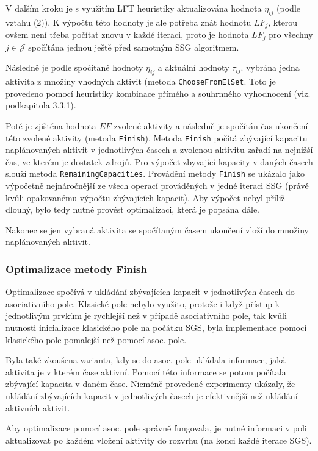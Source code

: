 \documentclass[a4paper,12pt]{article}
\begin{document}
V dalším kroku je s využitím LFT heuristiky aktualizována hodnota 
$\eta_{ij}$ (podle vztahu (2)). K výpočtu této hodnoty je ale potřeba znát hodnotu $LF_j$, kterou
ovšem není třeba počítat znovu v každé iteraci, proto je hodnota $LF_j$ pro všechny $j\in\mathcal{J}$
spočítána jednou ještě před samotným SSG algoritmem.

Následně je podle spočítané hodnoty $\eta_{ij}$ a aktuální hodnoty $\tau_{ij}$. vybrána jedna aktivita
z množiny vhodných aktivit (metoda \texttt{ChooseFromElSet}. Toto je provedeno pomocí heuristiky kombinace 
přímého a souhrnného vyhodnocení (viz. podkapitola 3.3.1).

Poté je zjištěna hodnota $EF$ zvolené aktivity a následně je spočítán čas ukončení
této zvolené aktivity (metoda \texttt{Finish}). Metoda \texttt{Finish} počítá zbývající
kapacitu naplánovaných aktivit v jednotlivých časech a zvolenou aktivitu zařadí na nejnižší čas, 
ve kterém je dostatek zdrojů. Pro výpočet zbyvající kapacity v daných časech slouží
metoda \texttt{RemainingCapacities}. Provádění metody \texttt{Finish} se ukázalo jako
výpočetně nejnáročnější ze všech operací prováděných v jedné iteraci SSG  (právě kvůli 
opakovanému výpočtu zbývajících kapacit). Aby výpočet nebyl příliž dlouhý, bylo tedy nutné
provést optimalizaci, která je popsána dále.

Nakonec se jen vybraná aktivita se spočítaným časem ukončení vloží do množiny naplánovaných aktivit.

\subsubsection{Optimalizace metody Finish}

Optimalizace spočívá v ukládání zbývajících kapacit v jednotlivých časech
do asociativního pole. Klasické pole nebylo využito, protože i když přístup k jednotlivým
prvkům je rychlejší než v případě asociativního pole, tak kvůli nutnosti inicializace klasického pole na počátku SGS,
byla implementace pomocí klasického pole pomalejší než pomocí asoc. pole.

Byla také zkoušena varianta, kdy se do asoc. pole ukládala informace, jaká aktivita je v
kterém čase aktivní. Pomocí této informace se potom počítala zbývající kapacita v daném
čase. Nicméně provedené experimenty ukázaly, že ukládání zbývajících kapacit v jednotlivých časech
je efektivnější než ukládání aktivních aktivit.

Aby optimalizace pomocí asoc. pole správně fungovala, je nutné informaci v poli aktualizovat po každém
vložení aktivity do rozvrhu (na konci každé iterace SGS).
\end{document}

